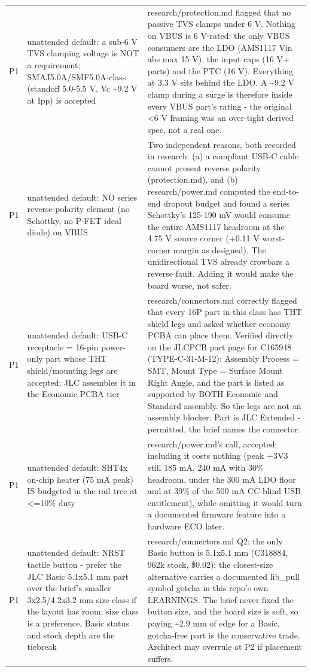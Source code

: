 \documentclass[11pt,a4paper]{article}
\begin{document}
{\begin{longtable}{lp{5.2cm}p{7.2cm}}
P1 & unattended default: a sub-6 V TVS clamping voltage is NOT a requirement; SMAJ5.0A/SMF5.0A-class (standoff 5.0-5.5 V, Vc \textasciitilde{}9.2 V at Ipp) is accepted & research/protection.md flagged that no passive TVS clamps under 6 V. Nothing on VBUS is 6 V-rated: the only VBUS consumers are the LDO (AMS1117 Vin abs max 15 V), the input caps (16 V+ parts) and the PTC (16 V). Everything at 3.3 V sits behind the LDO. A \textasciitilde{}9.2 V clamp during a surge is therefore inside every VBUS part's rating - the original \textless{}6 V framing was an over-tight derived spec, not a real one. \\
P1 & unattended default: NO series reverse-polarity element (no Schottky, no P-FET ideal diode) on VBUS & Two independent reasons, both recorded in research: (a) a compliant USB-C cable cannot present reverse polarity (protection.md), and (b) research/power.md computed the end-to-end dropout budget and found a series Schottky's 125-190 mV would consume the entire AMS1117 headroom at the 4.75 V source corner (+0.11 V worst-corner margin as designed). The unidirectional TVS already crowbars a reverse fault. Adding it would make the board worse, not safer. \\
P1 & unattended default: USB-C receptacle = 16-pin power-only part whose THT shield/mounting legs are accepted; JLC assembles it in the Economic PCBA tier & research/connectors.md correctly flagged that every 16P part in this class has THT shield legs and asked whether economy PCBA can place them. Verified directly on the JLCPCB part page for C165948 (TYPE-C-31-M-12): Assembly Process = SMT, Mount Type = Surface Mount Right Angle, and the part is listed as supported by BOTH Economic and Standard assembly. So the legs are not an assembly blocker. Part is JLC Extended - permitted, the brief names the connector. \\
P1 & unattended default: SHT4x on-chip heater (75 mA peak) IS budgeted in the rail tree at \textless{}=10\% duty & research/power.md's call, accepted: including it costs nothing (peak +3V3 still 185 mA, 240 mA with 30\% headroom, under the 300 mA LDO floor and at 39\% of the 500 mA CC-blind USB entitlement), while omitting it would turn a documented firmware feature into a hardware ECO later. \\
P1 & unattended default: NRST tactile button - prefer the JLC Basic 5.1x5.1 mm part over the brief's smaller 3x2.5/4.2x3.2 mm size class if the layout has room; size class is a preference, Basic status and stock depth are the tiebreak & research/connectors.md Q2: the only Basic button is 5.1x5.1 mm (C318884, 962k stock, \$0.02); the closest-size alternative carries a documented lib\_pull symbol gotcha in this repo's own LEARNINGS. The brief never fixed the button size, and the board size is soft, so paying \textasciitilde{}2.9 mm of edge for a Basic, gotcha-free part is the conservative trade. Architect may overrule at P2 if placement suffers. \\

\end{longtable}}
\end{document}
